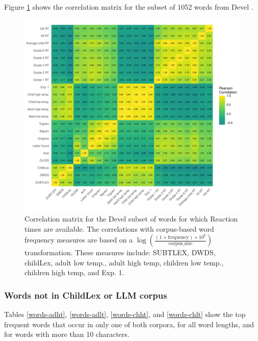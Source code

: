 \documentclass[doc, a4paper]{apa7}
\begin{document}
Figure \ref{fig:cormat_devel} shows the correlation matrix for the subset of 1052 words from Devel \citep{schroter_developmental_2017}. 

\begin{figure}[!htbp]
  \centerline{
    \includegraphics[width=\textwidth]{figures/correlation_matrix_devel.pdf}}
    \caption{Correlation matrix for the Devel subset of words for which Reaction times are available. The correlations with corpus-based word frequency measures are based on a $\log\left(\frac{(1 + \text{frequency}) \times 10^6}{\text{corpus\_size}}\right)$ transformation. These measures include: SUBTLEX, DWDS, childLex, adult low temp., adult high temp, children low temp., children high temp, and Exp. 1.}
    \label{fig:cormat_devel}
\end{figure}

\clearpage


\subsubsection{Words not in ChildLex or LLM corpus}

Tables \ref{words-adht}, \ref{words-adlt}, \ref{words-chht}, and \ref{words-chlt} show the top frequent words that occur in only one of both corpora, for all word lengths, and for words with more than 10 characters.
\end{document}
